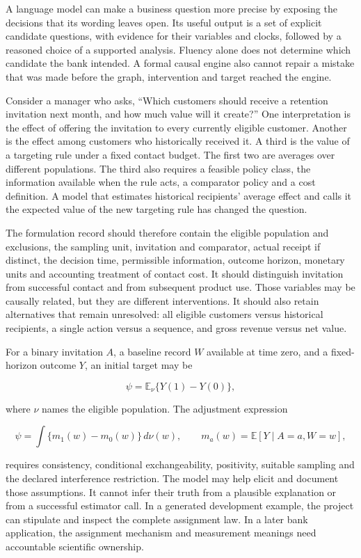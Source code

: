 \label{exec13:formulation}

A language model can make a business question more precise by exposing
the decisions that its wording leaves open. Its useful output is a set
of explicit candidate questions, with evidence for their variables and
clocks, followed by a reasoned choice of a supported analysis. Fluency
alone does not determine which candidate the bank intended. A formal
causal engine also cannot repair a mistake that was made before the
graph, intervention and target reached the engine.

Consider a manager who asks, ``Which customers should receive a
retention invitation next month, and how much value will it create?''
One interpretation is the effect of offering the invitation to every
currently eligible customer. Another is the effect among customers who
historically received it. A third is the value of a targeting rule under
a fixed contact budget. The first two are averages over different
populations. The third also requires a feasible policy class, the
information available when the rule acts, a comparator policy and a cost
definition. A model that estimates historical recipients' average effect
and calls it the expected value of the new targeting rule has changed
the question.

The formulation record should therefore contain the eligible population
and exclusions, the sampling unit, invitation and comparator, actual
receipt if distinct, the decision time, permissible information, outcome
horizon, monetary units and accounting treatment of contact cost. It
should distinguish invitation from successful contact and from
subsequent product use. Those variables may be causally related, but
they are different interventions. It should also retain alternatives
that remain unresolved: all eligible customers versus historical
recipients, a single action versus a sequence, and gross revenue versus
net value.

For a binary invitation \(A\), a baseline record \(W\) available at time
zero, and a fixed-horizon outcome \(Y\), an initial target may be

\[
 \psi=\mathbb E_{\nu}\{Y(1)-Y(0)\},
\]

where \(\nu\) names the eligible population. The adjustment expression

\[
 \psi=\int\{m_1(w)-m_0(w)\}\,d\nu(w),
 \qquad m_a(w)=\mathbb E[Y\mid A=a,W=w],
\]

requires consistency, conditional exchangeability, positivity, suitable
sampling and the declared interference restriction. The model may help
elicit and document those assumptions. It cannot infer their truth from
a plausible explanation or from a successful estimator call. In a
generated development example, the project can stipulate and inspect the
complete assignment law. In a later bank application, the assignment
mechanism and measurement meanings need accountable scientific
ownership.

